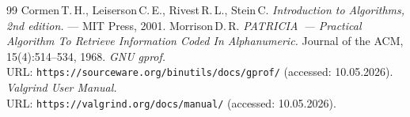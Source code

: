 \begin{thebibliography}{99}
Cormen\,T.\,H., Leiserson\,C.\,E., Rivest\,R.\,L., Stein\,C.
{\itshape Introduction to Algorithms, 2nd edition.} --- MIT Press, 2001.
Morrison\,D.\,R.
{\itshape PATRICIA~--- Practical Algorithm To Retrieve Information Coded In Alphanumeric.}
Journal of the ACM, 15(4):514--534, 1968.
{\itshape GNU gprof.} \\URL: \texttt{https://sourceware.org/binutils/docs/gprof/} (accessed: 10.05.2026).
{\itshape Valgrind User Manual.} \\URL: \texttt{https://valgrind.org/docs/manual/} (accessed: 10.05.2026).
\end{thebibliography}
